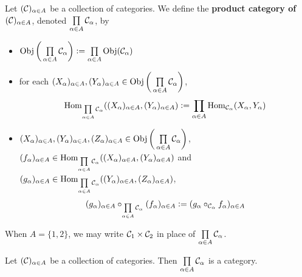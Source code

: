 \documentclass{book}
\begin{document}
	\begin{defn} 
		Let $(\mathcal{C})_{\alpha \in A}$ be a collection of categories. We define the \textbf{product category of $(\mathcal{C})_{\alpha \in A}$}, denoted $\prod\limits_{\alpha \in A} \mathcal{C}_{\alpha}$, by 
		\begin{itemize}
			\item $\operatorname{Obj} \bigg(\prod\limits_{\alpha \in A} \mathcal{C}_{\alpha} \bigg) \vcentcolon= \prod\limits_{\alpha \in A} \operatorname{Obj}(\mathcal{C}_{\alpha})$
			\item for each $(X_{\alpha})_{\alpha \in A}, (Y_\alpha)_{\alpha \in A} \in \operatorname{Obj} \bigg(\prod\limits_{\alpha \in A} \mathcal{C}_{\alpha} \bigg)$, 
			\[
			\operatorname{Hom}_{\prod\limits_{\alpha \in A} \mathcal{C}_{\alpha}}((X_{\alpha})_{\alpha \in A}, (Y_\alpha)_{\alpha \in A}) \vcentcolon= \prod\limits_{\alpha \in A} \operatorname{Hom}_{\mathcal{C}_{\alpha}}(X_{\alpha}, Y_{\alpha})
			\]
			\item $(X_{\alpha})_{\alpha \in A}, (Y_\alpha)_{\alpha \in A}, (Z_\alpha)_{\alpha \in A} \in \operatorname{Obj}\bigg(\prod\limits_{\alpha \in A} \mathcal{C}_{\alpha} \bigg) $, $(f_{\alpha})_{\alpha \in A} \in \operatorname{Hom}_{\prod\limits_{\alpha \in A} \mathcal{C}_{\alpha}}((X_{\alpha})_{\alpha \in A}, (Y_\alpha)_{\alpha \in A})$ and $(g_{\alpha})_{\alpha \in A} \in \operatorname{Hom}_{\prod\limits_{\alpha \in A} \mathcal{C}_{\alpha}}((Y_{\alpha})_{\alpha \in A}, (Z_\alpha)_{\alpha \in A})$,
			$$(g_{\alpha})_{\alpha \in A} \circ_{\prod\limits_{\alpha \in A} \mathcal{C}_{\alpha}} (f_{\alpha})_{\alpha \in A} \vcentcolon=  (g_{\alpha} \circ_{\mathcal{C}_{\alpha}} f_{\alpha})_{\alpha \in A}$$
		\end{itemize}
	\end{defn}
	
	\begin{note}
		When $A = \{1,2\}$, we may write $\mathcal{C}_1 \times \mathcal{C}_2$ in place of $\prod\limits_{\alpha \in A} \mathcal{C}_{\alpha}$.
	\end{note}

	\begin{ex} 
		Let $(\mathcal{C})_{\alpha \in A}$ be a collection of categories. Then $\prod\limits_{\alpha \in A} \mathcal{C}_{\alpha}$ is a category. 
	\end{ex}
	
\end{document}
